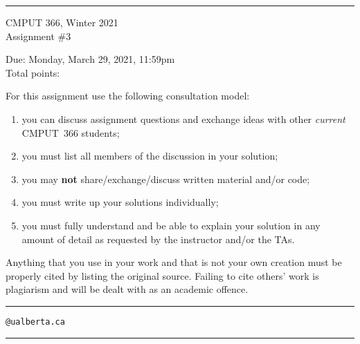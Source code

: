 \documentclass{article}
\newcounter{totalpoints}
\begin{document}
{\bigskip\hrule\bigskip
\huge
\noindent CMPUT 366, Winter 2021\\
Assignment \#3

\large
Due: Monday, March 29, 2021, 11:59pm\\
Total points: 

For this assignment use the following consultation model:
\begin{enumerate}

\item you can discuss assignment questions and exchange ideas with other \emph{current} CMPUT~366 students;

\item you must list all members of the discussion in your solution;

\item you may {\bf not} share/exchange/discuss written material and/or code;

\item you must write up your solutions individually;

\item you must fully understand and be able to explain your solution in any amount of detail as requested by the instructor and/or the TAs.

\end{enumerate}

Anything that you use in your work and that is not your own creation must be properly cited by listing the original source. Failing to cite others' work is plagiarism and will be dealt with as an academic offence.


\bigskip\bigskip\hrule\bigskip

\vspace{1cm}
\hspace{1cm}{\bf First name:} \underline{\hspace{7cm}}

\vspace{1cm}
\hspace{1cm}{\bf Last name:} \underline{\hspace{7cm}}

\vspace{1cm}
\hspace{1cm}{\bf CCID:} \underline{\hspace{5.5cm}}\verb|@ualberta.ca|

\vspace{1cm}
\hspace{1cm}{\bf Collaborators:} \underline{\hspace{6.5cm}}

\vspace{1cm}
\bigskip\hrule\bigskip
}
\end{document}
